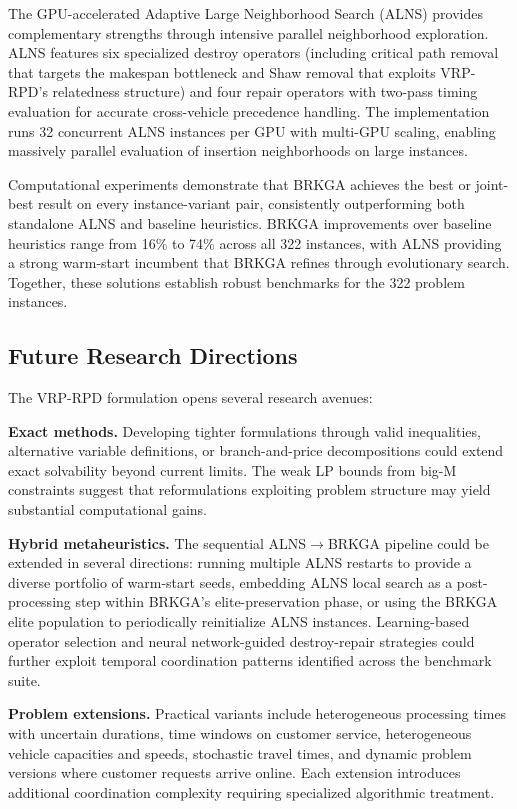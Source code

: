 \documentclass{article}
\begin{document}
The GPU-accelerated Adaptive Large Neighborhood Search (ALNS) provides complementary strengths through intensive parallel neighborhood exploration. ALNS features six specialized destroy operators (including critical path removal that targets the makespan bottleneck and Shaw removal that exploits VRP-RPD's relatedness structure) and four repair operators with two-pass timing evaluation for accurate cross-vehicle precedence handling. The implementation runs 32 concurrent ALNS instances per GPU with multi-GPU scaling, enabling massively parallel evaluation of insertion neighborhoods on large instances.

Computational experiments demonstrate that BRKGA achieves the best or joint-best result on every instance-variant pair, consistently outperforming both standalone ALNS and baseline heuristics. BRKGA improvements over baseline heuristics range from 16\% to 74\% across all 322 instances, with ALNS providing a strong warm-start incumbent that BRKGA refines through evolutionary search. Together, these solutions establish robust benchmarks for the 322 problem instances.

\subsection{Future Research Directions}

The VRP-RPD formulation opens several research avenues:

\textbf{Exact methods.} Developing tighter formulations through valid inequalities, alternative variable definitions, or branch-and-price decompositions could extend exact solvability beyond current limits. The weak LP bounds from big-M constraints suggest that reformulations exploiting problem structure may yield substantial computational gains.

\textbf{Hybrid metaheuristics.} The sequential ALNS$\to$BRKGA pipeline could be extended in several directions: running multiple ALNS restarts to provide a diverse portfolio of warm-start seeds, embedding ALNS local search as a post-processing step within BRKGA's elite-preservation phase, or using the BRKGA elite population to periodically reinitialize ALNS instances. Learning-based operator selection and neural network-guided destroy-repair strategies could further exploit temporal coordination patterns identified across the benchmark suite.

\textbf{Problem extensions.} Practical variants include heterogeneous processing times with uncertain durations, time windows on customer service, heterogeneous vehicle capacities and speeds, stochastic travel times, and dynamic problem versions where customer requests arrive online. Each extension introduces additional coordination complexity requiring specialized algorithmic treatment.
\end{document}
